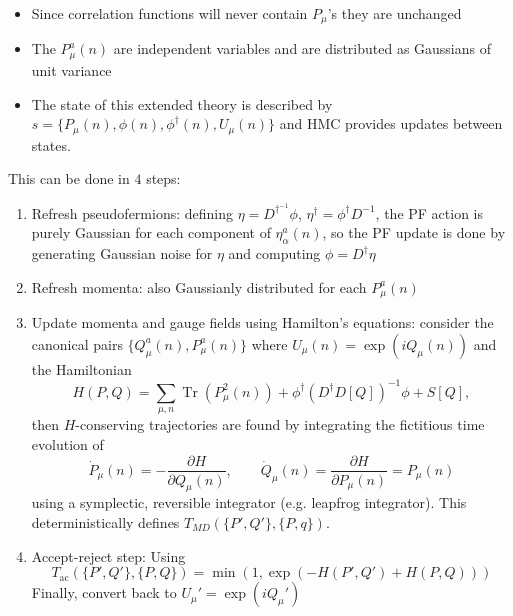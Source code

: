 \begin{itemize}
    \item Since correlation functions will never contain $P_\mu$'s they are unchanged
    \item The $P_\mu^a(n)$ are independent variables and are distributed as Gaussians of unit variance
\end{itemize}
\begin{itemize}
    \item The state of this extended theory is described by $s = \{ P_\mu(n), \phi(n), \phi^\dagger(n), U_\mu(n)\}$ and HMC provides updates between states.
\end{itemize}
This can be done in $4$ steps:
\begin{enumerate}
    \item Refresh pseudofermions: defining $\eta = D^{\dagger^{-1}}\phi$, $\eta^\dagger = \phi^\dagger D^{-1}$, the PF action is purely Gaussian for each component of $\eta_\alpha^a(n)$, so the PF update is done by generating Gaussian noise for $\eta$ and computing $\phi = D^\dagger \eta$
    \item Refresh momenta: also Gaussianly distributed for each $P_\mu^a(n)$
    \item Update momenta and gauge fields using Hamilton's equations: consider the canonical pairs $\{Q_\mu^a(n), P_\mu^a(n)\}$ where $U_\mu(n) = \exp(i Q_\mu(n))$ and the Hamiltonian
    \begin{equation}
        H(P,Q) = \sum_{\mu,n} \operatorname{Tr}(P_\mu^2(n)) + \phi^\dagger (D^\dagger D[Q])^{-1}\phi + S[Q],
    \end{equation}
    then $H$-conserving trajectories are found by integrating the fictitious time evolution of
    \begin{equation}
        \dot{P}_\mu(n) = -\frac{\partial H}{\partial Q_\mu(n)}, \qquad \dot{Q}_\mu(n) = \frac{\partial H}{\partial P_\mu(n)} = P_\mu(n)
    \end{equation}
    using a symplectic, reversible integrator (e.g. leapfrog integrator). This deterministically defines $T_{MD}(\{P',Q'\},\{P,q\})$.
    \item Accept-reject step: Using
    \begin{equation}
        T_\text{ac}(\{P',Q'\},\{P,Q\}) = \operatorname{min}(1,\exp(-H(P',Q')+H(P,Q)))
    \end{equation}
    Finally, convert back to $U_\mu' = \exp(i Q_\mu')$
\end{enumerate}


